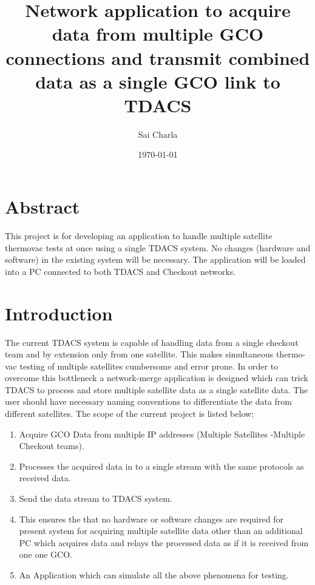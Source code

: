 \documentclass[12pt, a4paper]{report}
\title{Network application to acquire data from multiple GCO connections and
	   transmit combined data as a single GCO link to TDACS}
\author{Sai Charla}
\date{\today}
\begin{document}
\maketitle
\tableofcontents


\chapter*{Abstract}
\par This project is for developing an application to handle multiple satellite
thermovac tests at once using a single TDACS system. No changes (hardware and
software) in the existing system will be necessary. The application will be
loaded into a PC connected to both TDACS and Checkout networks.


\chapter{Introduction}

\par The current TDACS system is capable of handling data from a single
checkout team and by extension only from one satellite. This makes simultaneous
thermo-vac testing of multiple satellites cumbersome and error prone. In order
to overcome this bottleneck a network-merge application is designed which can
trick TDACS to process and store multiple satellite data as a single satellite
data. The user should have necessary naming conventions to differentiate the
data from different satellites. The scope of the current project is listed below:

	\begin{enumerate}
			\item Acquire GCO Data from multiple IP addresses (Multiple Satellites
					-Multiple Checkout teams).
			\item Processes the acquired data in to a single stream with the same
					protocols as received data.
			\item Send the data stream to TDACS system.
			\item This ensures the that no hardware or software changes are required
					for present system for acquiring multiple satellite data other than an
					additional PC which acquires data and relays the processed data as if it
					is received from one one GCO.
			\item An Application which can simulate all the above phenomena for
					testing.
	\end{enumerate}
\end{document}
